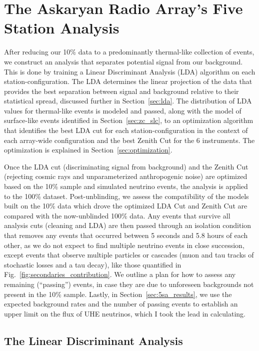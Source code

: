 \chapter{The Askaryan Radio Array's Five Station Analysis \label{chap:5sa_analysis}}

  After reducing our 10\% data to a predominantly thermal-like collection of events, we construct an analysis that separates potential signal from our background. 
  This is done by training a Linear Discriminant Analysis (LDA) algorithm on each station-configuration.
  The LDA determines the linear projection of the data that provides the best separation between signal and background relative to their statistical spread, discussed further in Section~\ref{sec:lda}.
  The distribution of LDA values for thermal-like events is modeled and passed, along with the model of surface-like events identified in Section~\ref{sec:zc_slc}, to an optimization algorithm that identifies the best LDA cut for each station-configuration in the context of each array-wide configuration and the best Zenith Cut for the 6 instruments. 
  The optimization is explained in Section~\ref{sec:optimization}.

  Once the LDA cut (discriminating signal from background) and the Zenith Cut (rejecting cosmic rays and unparameterized anthropogenic noise) are optimized based on the 10\% sample and simulated neutrino events, the analysis is applied to the 100\% dataset. 
  Post-unblinding, we assess the compatibility of the models built on the 10\% data which drove the optimized LDA Cut and Zenith Cut are compared with the now-unblinded 100\% data.
  Any events that survive all analysis cuts (cleaning and LDA) are then passed through an isolation condition that removes any events that occurred between 5 seconds and 5.8 hours of each other, as we do not expect to find multiple neutrino events in close succession, except events that observe multiple particles or cascades (muon and tau tracks of stochastic losses and a tau decay), like those quantified in Fig.~\ref{fig:secondaries_contribution}. 
  We outline a plan for how to assess any remaining (``passing'') events, in case they are due to unforeseen backgrounds not present in the 10\% sample. 
  Lastly, in Section~\ref{sec:5sa_results}, we use the expected background rates and the number of passing events to establish an upper limit on the flux of UHE neutrinos, which I took the lead in calculating. 

\section{The Linear Discriminant Analysis \label{sec:lda}}

